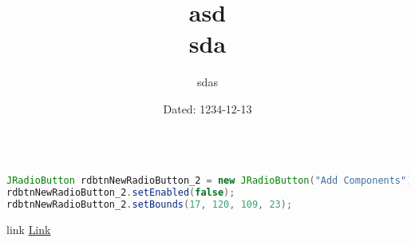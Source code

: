 \documentclass[a4paper]{article}
\title{asd\\ \vspace{5mm}
	\large sda}
\author{sdas}
\date{Dated: 1234-12-13}
\begin{document}
\maketitle

\begin{lstlisting}[language=Java]%, caption=asda]

JRadioButton rdbtnNewRadioButton_2 = new JRadioButton("Add Components");
rdbtnNewRadioButton_2.setEnabled(false);
rdbtnNewRadioButton_2.setBounds(17, 120, 109, 23);
\end{lstlisting}
link \href{www.youtube.com}{Link}
\end{document}
